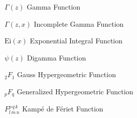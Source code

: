 

\begin{abbrv}
\item[$\Gamma(z)$]      Gamma Function
\item[$\Gamma(z,x)$]    Incomplete Gamma Function
\item[$\mathrm{Ei}(x)$] Exponential Integral Function          
\item[$\psi(z)$]        Digamma Function
\item[${}_2F_{1}$]      Gauss Hypergeometric Function
\item[${}_pF_{q}$]      Generalized Hypergeometric Function
\item[$ F^{p \, q \, k}_{l \, m \, n}$] Kampé de Fériet Function
\end{abbrv}